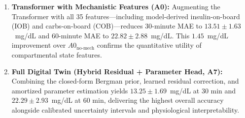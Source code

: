 \documentclass[journal]{IEEEtran}
\begin{document}
\begin{enumerate}
    \item \textbf{Transformer with Mechanistic Features (A0):} Augmenting the Transformer with all 35 features—including model-derived insulin-on-board (IOB) and carbs-on-board (COB)—reduces 30-minute MAE to $13.51 \pm 1.63$~mg/dL and 60-minute MAE to $22.82 \pm 2.88$~mg/dL. This $1.45$~mg/dL improvement over $A0_{\text{no-mech}}$ confirms the quantitative utility of compartmental state features.
    \item \textbf{Full Digital Twin (Hybrid Residual + Parameter Head, A7):} Combining the closed-form Bergman prior, learned residual correction, and amortized parameter estimation yields $13.25 \pm 1.69$~mg/dL at 30 min and $22.29 \pm 2.93$~mg/dL at 60 min, delivering the highest overall accuracy alongside calibrated uncertainty intervals and physiological interpretability.
\end{enumerate}
\end{document}
